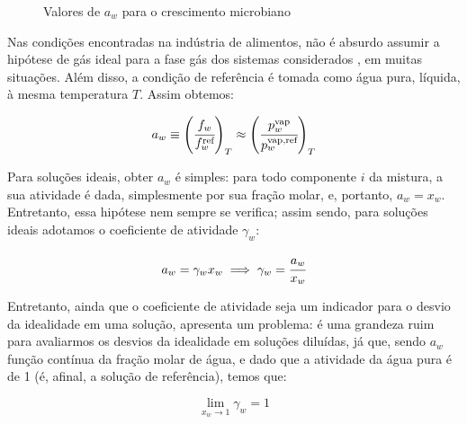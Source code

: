 \documentclass[
	12pt,				%
	openright,
	twoside,
	a4paper,			%
	english,			%
	french,				%
	brazil				%
	]{abntex2}
\begin{document}
\begin{figure}[h]
	\caption{Valores de $a_w$ para o crescimento microbiano}
	\label{fig:germ}
\end{figure}

Nas condições encontradas na indústria de alimentos, não é absurdo assumir a
hipótese de gás ideal para a fase gás dos sistemas
considerados \cite{canovas2007}, em muitas situações. Além disso, a condição de
referência é tomada como água pura, líquida, à mesma temperatura $T$. Assim
obtemos:

\begin{equation}
	\label{eq:def_atv}
	a_w \equiv \left(\cfrac{f_w}{f^\text{ref}_w}\right)_T%
		\approx \left(\cfrac{p^\text{vap}_w}{p^\text{vap,ref}_w}\right)_T
\end{equation}

Para soluções ideais, obter $a_w$ é simples: para todo componente $i$ da
mistura, a sua atividade é dada, simplesmente por sua fração molar, e, portanto,
$a_w = x_w$. Entretanto, essa hipótese nem sempre se verifica; assim sendo,
para soluções ideais adotamos o coeficiente de atividade $\gamma_w$:

\begin{equation}
	a_w = \gamma_wx_w \implies \gamma_w = \cfrac{a_w}{x_w}
\end{equation}

Entretanto, ainda que o coeficiente de atividade seja um indicador para o
desvio da idealidade em uma solução, apresenta um problema: é uma grandeza ruim
para avaliarmos os desvios da idealidade em soluções diluídas, já que, sendo
$a_w$ função contínua da fração molar de água, e dado que a atividade da água
pura é de 1 (é, afinal, a solução de referência), temos que:

\begin{equation}
	\lim_{x_w \to 1}\gamma_w = 1
\end{equation}
\end{document}
